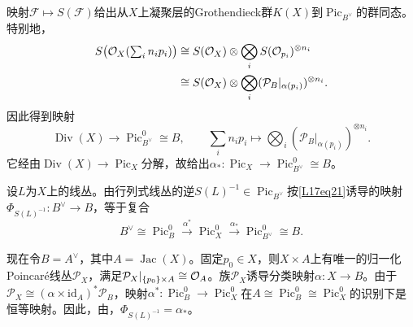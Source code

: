 映射$\mathcal F\mapsto S(\mathcal F)$给出从$X$上凝聚层的Grothendieck群$K(X)$到$\operatorname{Pic}_{B^\vee}$的群同态。特别地，
\[\begin{aligned}
S\bigl(\mathcal O_X(\textstyle\sum_i n_ip_i)\bigr)&\cong S(\mathcal O_X)\otimes\bigotimes_iS(\mathcal O_{p_i})^{\otimes n_i}\\
&\cong S(\mathcal O_X)\otimes\bigotimes_i(\mathcal P_B|_{\alpha(p_i)})^{\otimes n_i}.
\end{aligned}\]
因此得到映射
\[\operatorname{Div}(X)\longrightarrow\operatorname{Pic}_{B^\vee}^0\cong B,\qquad\sum_i n_ip_i\longmapsto\bigotimes_i(\mathcal P_B|_{\alpha(p_i)})^{\otimes n_i}.\]
它经由$\operatorname{Div}(X)\to\operatorname{Pic}_X$分解，故给出$\alpha_*:\operatorname{Pic}_X\to\operatorname{Pic}_{B^\vee}^0\cong B$。
\begin{proposition}\label{L17S3O1}
设$L$为$X$上的线丛。由行列式线丛的逆$S(L)^{-1}\in\operatorname{Pic}_{B^\vee}$按\eqref{L17eq21}诱导的映射$\Phi_{S(L)^{-1}}:B^\vee\to B$，等于复合
\[B^\vee\cong\operatorname{Pic}_B^0\xrightarrow{\alpha^*}\operatorname{Pic}_X^0\xrightarrow{\alpha_*}\operatorname{Pic}_{B^\vee}^0\cong B.\]
\end{proposition}
现在令$B=A^\vee$，其中$A=\operatorname{Jac}(X)$。固定$p_0\in X$，则$X\times A$上有唯一的归一化Poincaré线丛$\mathcal P_X$，满足$\mathcal P_X|_{\{p_0\}\times A}\cong\mathcal O_A$。族$\mathcal P_X$诱导分类映射$\alpha:X\to B$。由于$\mathcal P_X\cong(\alpha\times\mathrm{id}_A)^*\mathcal P_B$，映射$\alpha^*:\operatorname{Pic}_B^0\to\operatorname{Pic}_X^0$在$A\cong\operatorname{Pic}_B^0\cong\operatorname{Pic}_X^0$的识别下是恒等映射。因此，由，$\Phi_{S(L)^{-1}}=\alpha_*$。

